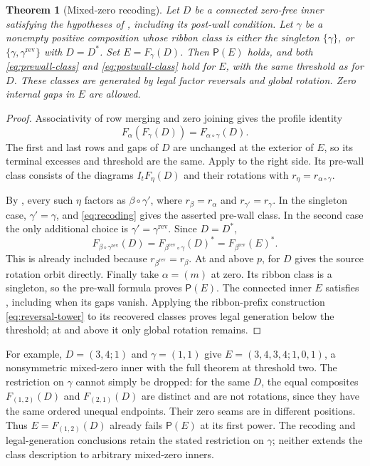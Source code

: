 \documentclass[11pt,a4paper]{amsart}
\numberwithin{equation}{section}
\theoremstyle{plain}
\newtheorem{theorem}{Theorem}[section]
\theoremstyle{definition}
\begin{document}
\begin{theorem}[Mixed-zero recoding]\label{thm:mixed-zero}
Let \(D\) be a connected zero-free inner satisfying the hypotheses of , including its post-wall condition.  Let \(\gamma\) be a nonempty positive composition whose ribbon class is either the singleton \(\{\gamma\}\), or \(\{\gamma,\gamma^{\mathrm{rev}}\}\) with \(D=D^*\).  Set \(E=F_\gamma(D)\).  Then \(\mathsf P(E)\) holds, and both \eqref{eq:prewall-class} and \eqref{eq:postwall-class} hold for \(E\), with the same threshold as for \(D\).  These classes are generated by legal factor reversals and global rotation.  Zero internal gaps in \(E\) are allowed.
\end{theorem}
\begin{proof}
Associativity of row merging and zero joining gives the profile identity
\begin{equation}\label{eq:recoding}
 F_\alpha(F_\gamma(D))=F_{\alpha\circ\gamma}(D).
\end{equation}
The first and last rows and gaps of \(D\) are unchanged at the exterior of \(E\), so its terminal excesses and threshold are the same.  Apply  to the right side.  Its pre-wall class consists of the diagrams \(I_tF_\eta(D)\) and their rotations with \(r_\eta=r_{\alpha\circ\gamma}\).

By \cite[Cor.~4.2 and Thm.~4.5]{Billera2006DecomposableCompositions}, every such \(\eta\) factors as \(\beta\circ\gamma'\), where \(r_\beta=r_\alpha\) and \(r_{\gamma'}=r_\gamma\).  In the singleton case, \(\gamma'=\gamma\), and \eqref{eq:recoding} gives the asserted pre-wall class.  In the second case the only additional choice is \(\gamma'=\gamma^{\mathrm{rev}}\).  Since \(D=D^*\),
\[
 F_{\beta\circ\gamma^{\mathrm{rev}}}(D)
 =F_{\beta^{\mathrm{rev}}\circ\gamma}(D)^*
 =F_{\beta^{\mathrm{rev}}}(E)^*.
\]
This is already included because \(r_{\beta^{\mathrm{rev}}}=r_\beta\).  At and above \(p\),  for \(D\) gives the source rotation orbit directly.  Finally take \(\alpha=(m)\) at zero.  Its ribbon class is a singleton, so the pre-wall formula proves \(\mathsf P(E)\).  The connected inner \(E\) satisfies , including when its gaps vanish.  Applying the ribbon-prefix construction \eqref{eq:reversal-tower} to its recovered classes proves legal generation below the threshold; at and above it only global rotation remains.
\end{proof}

For example, \(D=(3,4;1)\) and \(\gamma=(1,1)\) give \(E=(3,4,3,4;1,0,1)\), a nonsymmetric mixed-zero inner with the full theorem at threshold two.  The restriction on \(\gamma\) cannot simply be dropped: for the same \(D\), the equal composites \(F_{(1,2)}(D)\) and \(F_{(2,1)}(D)\) are distinct and are not rotations, since they have the same ordered unequal endpoints.  Their zero seams are in different positions.  Thus \(E=F_{(1,2)}(D)\) already fails \(\mathsf P(E)\) at its first power.  The recoding and legal-generation conclusions retain the stated restriction on \(\gamma\); neither extends the class description to arbitrary mixed-zero inners.
\end{document}

